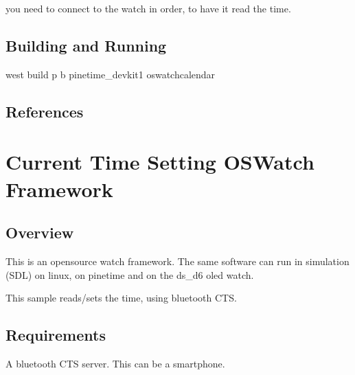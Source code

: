 \documentclass[letterpaper,10pt,english]{sphinxmanual}
\begin{document}
you need to connect to the watch in order, to have it read the time.

\begin{sphinxVerbatim}[commandchars=\\\{\}]
      
      
\end{sphinxVerbatim}


\subsection{Building and Running}
\label{\detokenize{samples/apposwatch-calendarREADME:building-and-running}}
west build \sphinxhyphen{}p \sphinxhyphen{}b  pinetime\_devkit1 oswatch\sphinxhyphen{}calendar


\subsection{References}
\label{\detokenize{samples/apposwatch-calendarREADME:references}}

\section{Current Time Setting  OSWatch Framework}
\label{\detokenize{samples/apposwatch-ctsREADME:current-time-setting-oswatch-framework}}\label{\detokenize{samples/apposwatch-ctsREADME:oswatch}}\label{\detokenize{samples/apposwatch-ctsREADME::doc}}

\subsection{Overview}
\label{\detokenize{samples/apposwatch-ctsREADME:overview}}
This is an opensource watch framework.
The same software can run in simulation (SDL) on linux, on pinetime and on the ds\_d6 oled watch.

This sample reads/sets the time, using bluetooth CTS.


\subsection{Requirements}
\label{\detokenize{samples/apposwatch-ctsREADME:requirements}}
A bluetooth CTS server.
This can be a smartphone.
\end{document}
